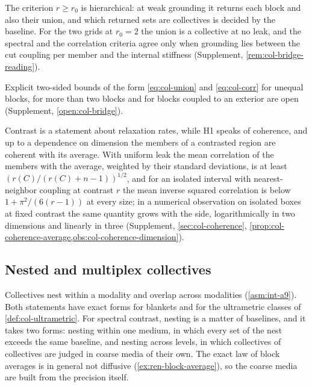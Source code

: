 The criterion $r\ge r_0$ is hierarchical: at weak grounding it returns each block and also their union, and which returned sets are collectives is decided by the baseline. For the two grids at $r_0=2$ the union is a collective at no leak, and the spectral and the correlation criteria agree only when grounding lies between the cut coupling per member and the internal stiffness (Supplement, \cref{rem:col-bridge-reading}).

Explicit two-sided bounds of the form \eqref{eq:col-union} and \eqref{eq:col-corr} for unequal blocks, for more than two blocks and for blocks coupled to an exterior are open (Supplement, \cref{open:col-bridge}).

Contrast is a statement about relaxation rates, while H1 speaks of coherence, and up to a dependence on dimension the members of a contrasted region are coherent with its average. With uniform leak the mean correlation of the members with the average, weighted by their standard deviations, is at least $(r(C)/(r(C)+n-1))^{1/2}$, and for an isolated interval with nearest-neighbor coupling at contrast $r$ the mean inverse squared correlation is below $1+\pi^2/(6(r-1))$ at every size; in a numerical observation on isolated boxes at fixed contrast the same quantity grows with the side, logarithmically in two dimensions and linearly in three (Supplement, \cref{sec:col-coherence}, \cref{prop:col-coherence-average,obs:col-coherence-dimension}).

\subsection{Nested and multiplex collectives}\label{sec:col-nested}

Collectives nest within a modality and overlap across modalities (\cref{asm:int-a9}). Both statements have exact forms for blankets and for the ultrametric classes of \cref{def:col-ultrametric}. For spectral contrast, nesting is a matter of baselines, and it takes two forms: nesting within one medium, in which every set of the nest exceeds the same baseline, and nesting across levels, in which collectives of collectives are judged in coarse media of their own. The exact law of block averages is in general not diffusive (\cref{ex:ren-block-average}), so the coarse media are built from the precision itself.

